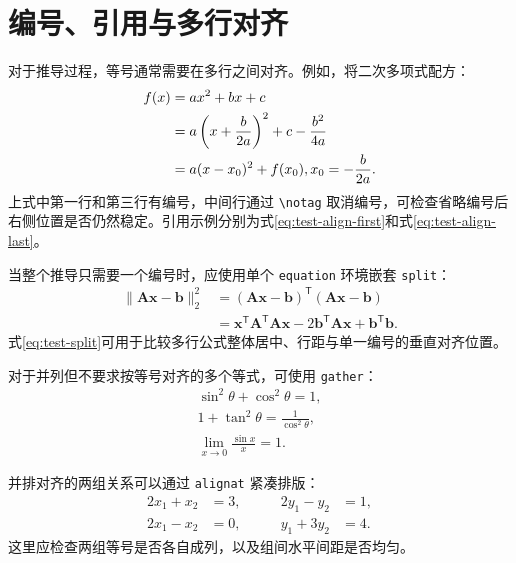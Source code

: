 \section{编号、引用与多行对齐}
\label{sec:formula-align}

对于推导过程，等号通常需要在多行之间对齐。例如，将二次多项式配方：
\begin{align}
  f(x)
    &= ax^2+bx+c \label{eq:test-align-first}\\
    &= a\left(x+\frac{b}{2a}\right)^2
       +c-\frac{b^2}{4a} \notag\\
    &= a(x-x_0)^2+f(x_0),
       \qquad x_0=-\frac{b}{2a}. \label{eq:test-align-last}
\end{align}
上式中第一行和第三行有编号，中间行通过 \texttt{\textbackslash notag} 取消编号，可检查省略编号后右侧位置是否仍然稳定。引用示例分别为式\eqref{eq:test-align-first}和式\eqref{eq:test-align-last}。

当整个推导只需要一个编号时，应使用单个 \texttt{equation} 环境嵌套 \texttt{split}：
\begin{equation}
  \label{eq:test-split}
  \begin{split}
    \lVert\boldsymbol{A}\boldsymbol{x}-\boldsymbol{b}\rVert_2^2
      &= (\boldsymbol{A}\boldsymbol{x}-\boldsymbol{b})^{\mathsf{T}}
         (\boldsymbol{A}\boldsymbol{x}-\boldsymbol{b})\\
      &= \boldsymbol{x}^{\mathsf{T}}\boldsymbol{A}^{\mathsf{T}}\boldsymbol{A}\boldsymbol{x}
         -2\boldsymbol{b}^{\mathsf{T}}\boldsymbol{A}\boldsymbol{x}
         +\boldsymbol{b}^{\mathsf{T}}\boldsymbol{b}.
  \end{split}
\end{equation}
式\eqref{eq:test-split}可用于比较多行公式整体居中、行距与单一编号的垂直对齐位置。

对于并列但不要求按等号对齐的多个等式，可使用 \texttt{gather}：
\begin{gather}
  \sin^2\theta+\cos^2\theta=1,
  \label{eq:test-gather-trig}\\
  1+\tan^2\theta=\frac{1}{\cos^2\theta},
  \label{eq:test-gather-tan}\\
  \lim_{x\to 0}\frac{\sin x}{x}=1.
  \label{eq:test-gather-limit}
\end{gather}

并排对齐的两组关系可以通过 \texttt{alignat} 紧凑排版：
\begin{alignat}{2}
  x_1+x_2 &= 3, &\qquad 2y_1-y_2 &= 1, \label{eq:test-alignat-a}\\
  2x_1-x_2 &= 0, &\qquad y_1+3y_2 &= 4. \label{eq:test-alignat-b}
\end{alignat}
这里应检查两组等号是否各自成列，以及组间水平间距是否均匀。

